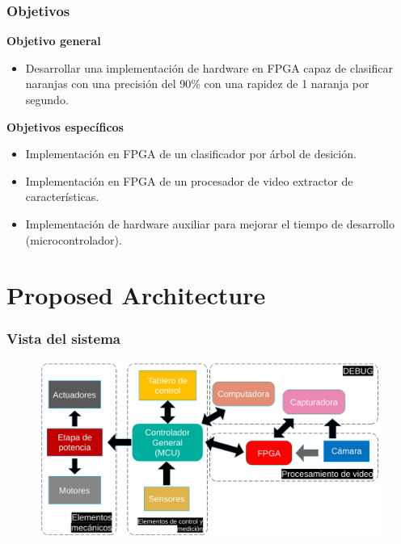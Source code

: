 \documentclass[
serif,
compress,
xcolor=table,
dvipsnames,
]{beamer}
\begin{document}
\begin{frame}
	\frametitle{Objetivos}

	\textbf{Objetivo general}
	\begin{itemize}
		\item Desarrollar una implementación de hardware en FPGA capaz de clasificar naranjas con una precisión del 90\% con una rapidez de 1 naranja por segundo.
	\end{itemize}
	
	\textbf{Objetivos específicos}
	\begin{itemize}
		\item Implementación en FPGA de un clasificador por árbol de desición.
		\item Implementación en FPGA de un procesador de video extractor de características.
		\item Implementación de hardware  auxiliar para mejorar el tiempo de desarrollo (microcontrolador).
	\end{itemize}
\end{frame}


\section{Proposed Architecture}
\begin{frame}
\frametitle{Vista del sistema}



\begin{figure}[h]
    \centering
    \includegraphics[width=\linewidth]{F/diagramagralelectrico}
    \label{overview}
\end{figure}


\end{frame}
\end{document}
